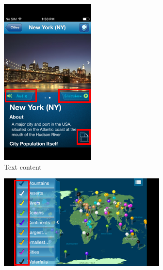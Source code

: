 \begin{figure}[!hbt]
\begin{subfigure}{0.25\textwidth}
\includegraphics[width=\textwidth]{design3}
\caption{Text content}
    \end{subfigure}\hspace{0.1\textwidth}
 \begin{subfigure}{0.55\textwidth}
\includegraphics[width=\textwidth]{design2}

\end{subfigure}
\end{figure}
